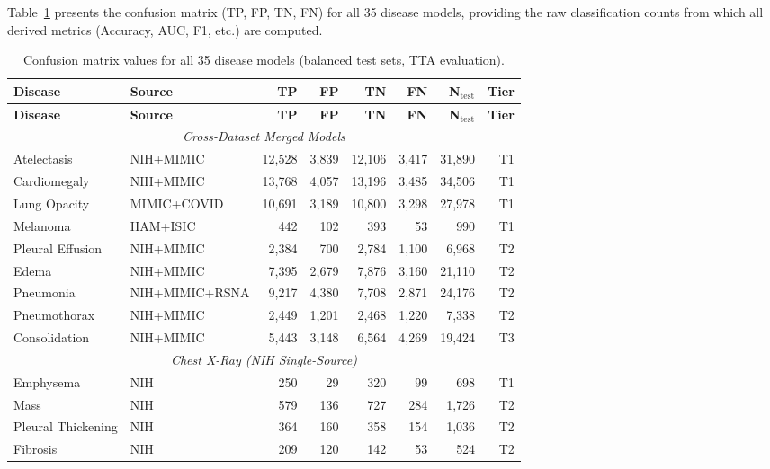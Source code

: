 \documentclass[12pt,a4paper]{report}
\begin{document}
Table~\ref{tab:confusion_all} presents the confusion matrix (TP, FP, TN, FN) for all 35 disease models, providing the raw classification counts from which all derived metrics (Accuracy, AUC, F1, etc.) are computed.

\begingroup\footnotesize
\setlength{\tabcolsep}{4pt}
\setlength{\LTleft}{0pt plus 1fill}
\setlength{\LTright}{0pt plus 1fill}
\begin{longtable}{@{}llrrrrrr@{}}
\caption{Confusion matrix values for all 35 disease models (balanced test sets, TTA evaluation).} \label{tab:confusion_all} \\
\toprule
\textbf{Disease} & \textbf{Source} & \textbf{TP} & \textbf{FP} & \textbf{TN} & \textbf{FN} & \textbf{N$_{\text{test}}$} & \textbf{Tier} \\
\midrule
\endfirsthead
\toprule
\textbf{Disease} & \textbf{Source} & \textbf{TP} & \textbf{FP} & \textbf{TN} & \textbf{FN} & \textbf{N$_{\text{test}}$} & \textbf{Tier} \\
\midrule
\endhead
\midrule
\multicolumn{8}{c}{\textit{Cross-Dataset Merged Models}} \\
\midrule
Atelectasis & NIH+MIMIC & 12,528 & 3,839 & 12,106 & 3,417 & 31,890 & T1 \\
Cardiomegaly & NIH+MIMIC & 13,768 & 4,057 & 13,196 & 3,485 & 34,506 & T1 \\
Lung Opacity & MIMIC+COVID & 10,691 & 3,189 & 10,800 & 3,298 & 27,978 & T1 \\
Melanoma & HAM+ISIC & 442 & 102 & 393 & 53 & 990 & T1 \\
Pleural Effusion & NIH+MIMIC & 2,384 & 700 & 2,784 & 1,100 & 6,968 & T2 \\
Edema & NIH+MIMIC & 7,395 & 2,679 & 7,876 & 3,160 & 21,110 & T2 \\
Pneumonia & NIH+MIMIC+RSNA & 9,217 & 4,380 & 7,708 & 2,871 & 24,176 & T2 \\
Pneumothorax & NIH+MIMIC & 2,449 & 1,201 & 2,468 & 1,220 & 7,338 & T2 \\
Consolidation & NIH+MIMIC & 5,443 & 3,148 & 6,564 & 4,269 & 19,424 & T3 \\
\midrule
\multicolumn{8}{c}{\textit{Chest X-Ray (NIH Single-Source)}} \\
\midrule
Emphysema & NIH & 250 & 29 & 320 & 99 & 698 & T1 \\
Mass & NIH & 579 & 136 & 727 & 284 & 1,726 & T2 \\
Pleural Thickening & NIH & 364 & 160 & 358 & 154 & 1,036 & T2 \\
Fibrosis & NIH & 209 & 120 & 142 & 53 & 524 & T2 \\

\end{longtable}
\end{document}
